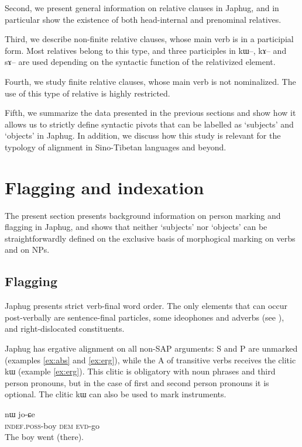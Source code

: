 \documentclass[oldfontcommands,oneside,a4paper,11pt]{article}
\newcommand{\ipa}[1]{{\phon #1}} %
\begin{document}
Second, we present general information on relative clauses in Japhug, and in particular show the existence of both head-internal and prenominal relatives.

Third, we describe   non-finite relative clauses, whose main verb is in a participial form. Most relatives belong to this type, and three participles in \ipa{kɯ--}, \ipa{kɤ--} and \ipa{sɤ--} are used depending on the syntactic function of the relativized element.

Fourth, we study finite relative clauses,  whose main verb is not nominalized. The use of this type of relative is highly restricted.

Fifth, we summarize the data presented in the previous sections and show how it allows us to strictly define syntactic pivots that can be labelled as `subjects' and `objects' in Japhug. In addition, we discuss how this study is relevant for the typology of alignment in Sino-Tibetan languages and beyond.



\section{Flagging and indexation} \label{sec:flagging.indexation}
The present section presents background information on person marking and flagging in Japhug, and shows that neither `subjects' nor `objects' can be straightforwardly defined on the exclusive basis of morphogical marking on  verbs and on NPs.


\subsection{Flagging}
Japhug presents strict verb-final word order. The only elements that can occur post-verbally are sentence-final particles, some ideophones and adverbs (see \citealt[275-6]{japhug14ideophones}), and right-dislocated constituents.

Japhug has ergative alignment on all non-SAP arguments:  S and P are unmarked (examples \ref{ex:abs} and \ref{ex:erg}), while the A of transitive verbs receives the clitic \ipa{kɯ} (example \ref{ex:erg}). This clitic is obligatory with noun phrases and third person pronouns, but in the case of first and second person pronouns it is optional. The clitic \ipa{kɯ} can also be used to mark instruments.

\begin{exe}
\ex \label{ex:abs}
\gll \ipa{tɤ-tɕɯ}  	\ipa{nɯ}  	 	\ipa{jo-ɕe}   \\
\textsc{indef.poss}-boy \textsc{dem}   \textsc{evd}-go \\
\glt The boy went (there).
\end{exe}
\end{document}
